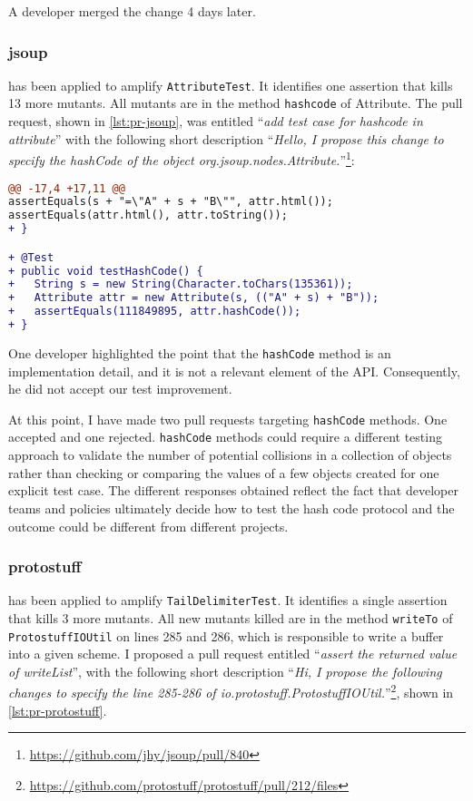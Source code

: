 A developer merged the change 4 days later.

\subsubsection{jsoup}

\dspot has been applied to amplify \texttt{AttributeTest}. 
It identifies one assertion that kills 13 more mutants.
All mutants are in the method \texttt{hashcode} of Attribute. 
The pull request, shown in \autoref{lst:pr-jsoup}, was entitled ``\emph{add test case for hashcode in attribute}'' with the following short description ``\emph{Hello, I propose this change to specify the hashCode of the object org.jsoup.nodes.Attribute.}''\footnote{\url{https://github.com/jhy/jsoup/pull/840}}:

\begin{lstlisting}[language=diff,caption=Test-improvement proposed to jsoup developers.,label=lst:pr-jsoup]
@@ -17,4 +17,11 @@
assertEquals(s + "=\"A" + s + "B\"", attr.html());
assertEquals(attr.html(), attr.toString());
+ }

+ @Test
+ public void testHashCode() {
+   String s = new String(Character.toChars(135361));
+   Attribute attr = new Attribute(s, (("A" + s) + "B"));
+   assertEquals(111849895, attr.hashCode());
+ }
\end{lstlisting}

One developer highlighted the point that the \texttt{hashCode} method is an implementation detail, and it is not a relevant element of the API. 
Consequently, he did not accept our test improvement.

At this point, I have made two pull requests targeting \texttt{hashCode} methods. 
One accepted and one rejected. 
\texttt{hashCode} methods could require a different testing approach to validate the number of potential collisions in a collection of objects rather than checking or comparing the values of a few objects created for one explicit test case.
The different responses obtained reflect the fact that developer teams and policies ultimately decide how to test the hash code protocol and the outcome could be different from different projects.

\subsubsection{protostuff}

\dspot has been applied to amplify \texttt{TailDelimiterTest}. 
It identifies a single assertion that kills 3 more mutants.
All new mutants killed are in the method \texttt{writeTo} of \texttt{ProtostuffIOUtil} on lines 285 and 286, which is responsible to write a buffer into a given scheme. 
I proposed a pull request entitled ``\emph{assert the returned value of writeList}'', with the following short description ``\emph{Hi, I propose the following changes to specify the line 285-286 of io.protostuff.ProtostuffIOUtil.}''\footnote{\url{https://github.com/protostuff/protostuff/pull/212/files}}, shown in \autoref{lst:pr-protostuff}.

